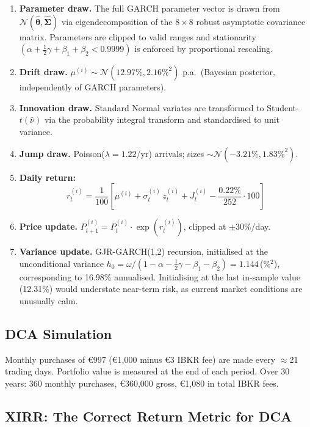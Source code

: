 \documentclass[11pt, a4paper]{article}
\begin{document}
\begin{enumerate}[leftmargin=1.5em, itemsep=4pt]
  \item \textbf{Parameter draw.} The full GARCH parameter vector is drawn from $\mathcal{N}(\hat{\boldsymbol\theta},\hat{\boldsymbol\Sigma})$ via eigendecomposition of the $8\times8$ robust asymptotic covariance matrix. Parameters are clipped to valid ranges and stationarity $(\alpha+\tfrac12\gamma+\beta_1+\beta_2<0.9999)$ is enforced by proportional rescaling.
  \item \textbf{Drift draw.} $\mu^{(i)}\sim\mathcal{N}(12.97\%, 2.16\%^2)$ p.a.\ (Bayesian posterior, independently of GARCH parameters).
  \item \textbf{Innovation draw.} Standard Normal variates are transformed to Student-$t(\hat\nu)$ via the probability integral transform and standardised to unit variance.
  \item \textbf{Jump draw.} Poisson($\lambda=1.22$/yr) arrivals; sizes $\sim\mathcal{N}(-3.21\%, 1.83\%^2)$.
  \item \textbf{Daily return:}
    \begin{equation}
      r_t^{(i)} = \frac{1}{100}\!\left[\mu^{(i)} + \sigma_t^{(i)}\,z_t^{(i)} + J_t^{(i)} - \frac{0.22\%}{252}\cdot100\right]
      \label{eq:return}
    \end{equation}
  \item \textbf{Price update.} $P_{t+1}^{(i)} = P_t^{(i)}\cdot\exp\!\left(r_t^{(i)}\right)$, clipped at $\pm$30\%/day.
  \item \textbf{Variance update.} GJR-GARCH(1,2) recursion, initialised at the unconditional variance $h_0=\omega/(1-\alpha-\tfrac12\gamma-\beta_1-\beta_2)=1.144$\,(\%$^2$), corresponding to 16.98\% annualised. Initialising at the last in-sample value (12.31\%) would understate near-term risk, as current market conditions are unusually calm.
\end{enumerate}

\subsection{DCA Simulation}

Monthly purchases of \euro{}997 (\euro{}1{,}000 minus \euro{}3 IBKR fee) are made every $\approx$21 trading days. Portfolio value is measured at the end of each period. Over 30 years: 360 monthly purchases, \euro{}360{,}000 gross, \euro{}1{,}080 in total IBKR fees.

\subsection{XIRR: The Correct Return Metric for DCA}
\end{document}
